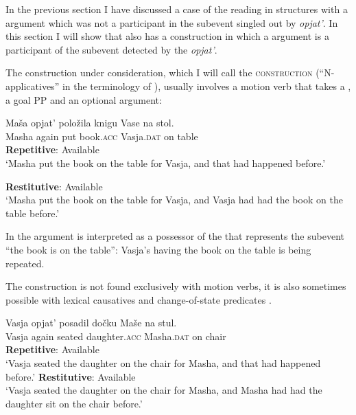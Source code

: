 \documentclass[output=paper]{langscibook}
\begin{document}
In the previous section I have discussed a case of the  reading in structures with a  argument which was not a participant in the  subevent singled out by \textit{opjat’}. In this section I will show that  also has a construction in which a  argument is a participant of the  subevent detected by the  \textit{opjat’}.



The construction under consideration, which I will call the \textsc{  construction} (“N-applicatives” in the terminology of \citealt{Pshekhotskaya2012}), usually involves a motion verb that takes a , a goal PP and an optional  argument:\largerpage


 \ea\label{ex:bondarenko:36}
\gll Maša opjat’ položila knigu Vase na stol.\\
     Masha again put book.\textsc{acc} Vasja.\textsc{dat} on table\\
\ea \textbf{Repetitive}: Available\\
`Masha put the book on the table for Vasja, and that had   happened before.'

\newpage 
\ex \textbf{Restitutive}: Available\\
`Masha put the book on the table for Vasja, and Vasja had had   the book on the table before.'
\z\z


\noindent In  the  argument is interpreted as a possessor of the  that represents the  subevent “the book is on the table”: Vasja’s having the book on the table is being repeated.



The   construction is not found exclusively with motion verbs, it is also sometimes possible with lexical causatives  and change-of-state predicates .


 \ea\label{ex:bondarenko:37}
\gll Vasja opjat’ posadil dočku Maše na stul.\\
     Vasja again seated daughter.\textsc{acc} Masha.\textsc{dat} on chair\\
\ea \textbf{Repetitive}: Available\\
`Vasja seated the daughter on the chair for Masha, and that had   happened before.'
\ex \textbf{Restitutive}: Available\\
`Vasja seated the daughter on the chair for Masha, and Masha   had had the daughter sit on the chair before.'
\z\z
\end{document}
